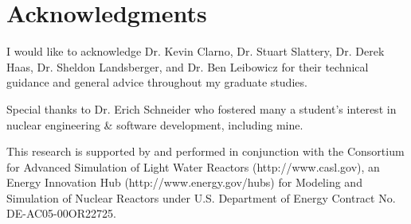 
\section*{Acknowledgments}

I would like to acknowledge Dr. Kevin Clarno, Dr. Stuart Slattery, Dr. Derek Haas, Dr. Sheldon Landsberger, and Dr. Ben Leibowicz for their technical guidance and general advice throughout my graduate studies.

Special thanks to Dr. Erich Schneider who fostered many a student's interest in nuclear engineering \& software development, including mine.

This research is supported by and performed in conjunction with the Consortium for Advanced Simulation of Light Water Reactors (http://www.casl.gov), an Energy Innovation Hub (http://www.energy.gov/hubs) for Modeling and Simulation of Nuclear Reactors under U.S. Department of Energy Contract No. DE-AC05-00OR22725.
\newpage
